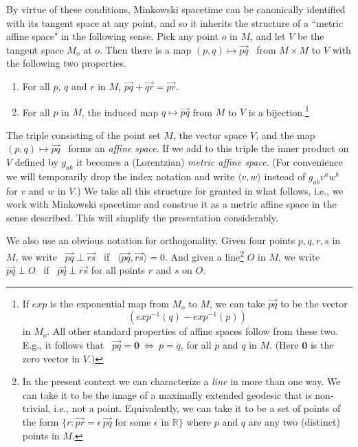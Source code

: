 \documentclass [12] {article}
\theoremstyle{plain}
\numberwithin{figure}{subsection}
\numberwithin{proposition}{subsection}
\begin{document}
By virtue of these conditions, Minkowski spacetime can be canonically identified with its tangent space at any point, and so it inherits  
the structure of a ``metric affine space" in the following sense.  Pick any point $o$ in $M$,  and let $V$ be the tangent space $M_o$ at $o$.  Then there is a map $(p, q) \mapsto  \overrightarrow{pq}$ \, from $M \times M$ to $V$ with the following two properties.
%
\vspace{-.5em}
\begin{enumerate}
\item [(1)]  For all $p$, $q$ and $r$ in $M$, $\overrightarrow{pq} + \overrightarrow{qr} = \overrightarrow{pr}$.
\item[(2)]  For all $p$ in $M$, the induced map  $q \mapsto  \overrightarrow{pq}$ from $M$ to $V$ is a bijection.\footnote{If  $exp$ is the exponential map from $M_o$ to $M$, we can take $\overrightarrow{pq}$ to be the vector 
\[
(exp^{-1}(q) - exp^{-1}(p))
 \] 
 in $M_o$. All other standard properties  of affine spaces follow from these two. E.g., it follows that \  $\overrightarrow{pq} = \mathbf{0} \  \Longleftrightarrow \  p = q$, for all  $p$ and $q$ in $M$. (Here $\mathbf{0}$ is the zero vector in $V$.)}
\end{enumerate}

The triple consisting of the point set $M$, the vector space $V$, and the map \,  $(p, q) \mapsto  \overrightarrow{pq}$ \, forms an \emph{affine space}.  If we add to this triple the inner product on $V$ defined by $g_{ab}$ it becomes a (Lorentzian)  \emph{metric affine space}. (For convenience we will temporarily drop the index notation and write  $\langle v, w\rangle$ instead of  $g_{ab} v^a w^b$ for $v$ and $w$ in $V$.) We take all this structure for granted in what follows, i.e., we work with Minkowski  spacetime and construe it as a metric affine space in the sense described. This will simplify the presentation considerably. 
 
 
We also use an obvious notation for orthogonality. Given four points $p,  q,  r, s$  in $M$, we write \,  $\overrightarrow{pq} \perp \overrightarrow{rs}$ \,  if  \, $\langle \overrightarrow{pq},  \overrightarrow{rs} \rangle = 0$.  And given a line\footnote{In the present context we can characterize a \emph{line} in more than one way. We can take it to be the  image of a maximally extended geodesic that is non-trivial, i.e., not a point. Equivalently, we can take it to be a set of points of the form   $\{r:  \overrightarrow{pr} =  \epsilon \, \overrightarrow{pq}$ for some $\epsilon$ in  $\mathbb{R}\}$ where $p$ and $q$ are any two (distinct) points in $M$.} $O$ in $M$,  we write \,  $\overrightarrow{pq} \perp O  $ \, if \, $\overrightarrow{pq} \perp \overrightarrow{rs}$  for all points $r$ and $s$ on $O$.    
\end{document}
